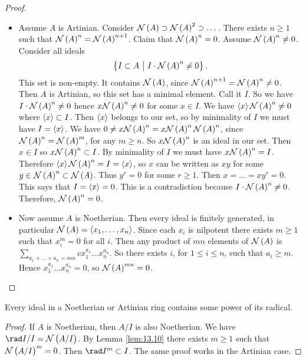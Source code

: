 \begin{proof}
\hfill
\begin{itemize}
\item Assume $ A $ is Artinian. Consider $ \NNN\br{A} \supset \NNN\br{A}^2 \supset \dots $. There exists $ n \ge 1 $ such that $ \NNN\br{A}^n = \NNN\br{A}^{n + 1} $. Claim that $ \NNN\br{A}^n = 0 $. Assume $ \NNN\br{A}^n \ne 0 $. Consider all ideals
$$ \cbr{I \subset A \st I \cdot \NNN\br{A}^n \ne 0}. $$
This set is non-empty. It contains $ \NNN\br{A} $, since $ \NNN\br{A}^{n + 1} = \NNN\br{A}^n \ne 0 $. Then $ A $ is Artinian, so this set has a minimal element. Call it $ I $. So we have $ I \cdot \NNN\br{A}^n \ne 0 $ hence $ x\NNN\br{A}^n \ne 0 $ for some $ x \in I $. We have $ \abr{x}\NNN\br{A}^n \ne 0 $ where $ \left\langle x \right\rangle \subset I $. Then $ \left\langle x \right\rangle $ belongs to our set, so by minimality of $ I $ we must have $ I = \left\langle x \right\rangle $. We have $ 0 \ne x\NNN\br{A}^n = x\NNN\br{A}^n\NNN\br{A}^n $, since $ \NNN\br{A}^n = \NNN\br{A}^m $, for any $ m \ge n $. So $ x\NNN\br{A}^n $ is an ideal in our set. Then $ x \in I $ so $ x\NNN\br{A}^n \subset I $. By minimality of $ I $ we must have $ x\NNN\br{A}^n = I $. Therefore $ \abr{x}\NNN\br{A}^n = I = \abr{x} $, so $ x $ can be written as $ xy $ for some $ y \in \NNN\br{A}^n \subset \NNN\br{A} $. Thus $ y^r = 0 $ for some $ r \ge 1 $. Then $ x = \dots = xy^r = 0 $. This says that $ I = \left\langle x \right\rangle = 0 $. This is a contradiction because $ I \cdot \NNN\br{A}^n \ne 0 $. Therefore, $ \NNN\br{A}^n = 0 $.
\item Now assume $ A $ is Noetherian. Then every ideal is finitely generated, in particular $ \NNN\br{A} = \abr{x_1, \dots, x_n} $. Since each $ x_i $ is nilpotent there exists $ m \ge 1 $ such that $ x_i^m = 0 $ for all $ i $. Then any product of $ mn $ elements of $ \NNN\br{A} $ is $ \sum_{a_1 + \dots + a_n = mn} cx_1^{a_1} \dots x_n^{a_n} $. So there exists $ i $, for $ 1 \le i \le n $, such that $ a_i \ge m $. Hence $ x_1^{a_1} \dots x_n^{a_n} = 0 $, so $ \NNN\br{A}^{mn} = 0 $.
\end{itemize}
\end{proof}


\begin{corollary}
\label{cor:13.11}
Every ideal in a Noetherian or Artinian ring contains some power of its radical.
\end{corollary}

\begin{proof}
If $ A $ is Noetherian, then $ A / I $ is also Noetherian. We have $ \rad I / I = \NNN\br{A / I} $. By Lemma \ref{lem:13.10} there exists $ m \ge 1 $ such that $ \NNN\br{A / I}^m = 0 $. Then $ \rad I^m \subset I $. The same proof works in the Artinian case.
\end{proof}

